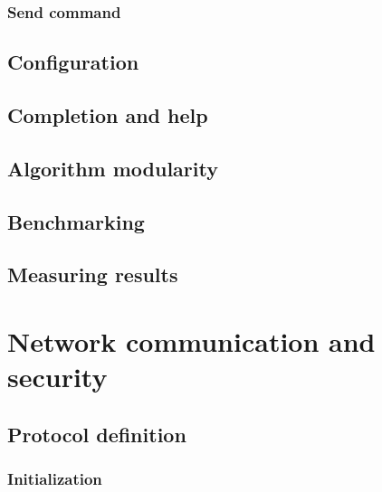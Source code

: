 \subsection{Send command}
\label{sec:cmd_app_send}


\section{Configuration}
\label{sec:cmd_config}


\section{Completion and help}
\label{sec:cmd_help}


\section{Algorithm modularity}
\label{sec:algs_modularity}


\section{Benchmarking}
\label{sec:cmd_benchmark}


\section{Measuring results}
\label{sec:lattice_performance_measuring}


\chapter{Network communication and security}
\label{ch:network_com_sec}


\section{Protocol definition}
\label{sec:protocol_def}


\subsection{Initialization}
\label{subsec:init_phase}


